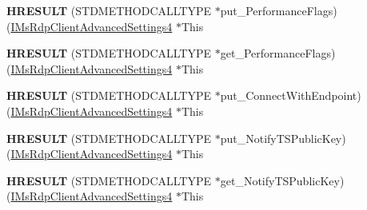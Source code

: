 \begin{DoxyCompactItemize}
{\bfseries H\+R\+E\+S\+U\+LT} (S\+T\+D\+M\+E\+T\+H\+O\+D\+C\+A\+L\+L\+T\+Y\+PE $\ast$put\+\_\+\+Performance\+Flags)(\hyperlink{interface_m_s_t_s_c_lib_1_1_i_ms_rdp_client_advanced_settings4}{I\+Ms\+Rdp\+Client\+Advanced\+Settings4} $\ast$This
\item 
\mbox{\label{struct_m_s_t_s_c_lib_1_1_i_ms_rdp_client_advanced_settings4_vtbl_a34690ef59bca6b2a9ad10f9aa11ef66f}} 
{\bfseries H\+R\+E\+S\+U\+LT} (S\+T\+D\+M\+E\+T\+H\+O\+D\+C\+A\+L\+L\+T\+Y\+PE $\ast$get\+\_\+\+Performance\+Flags)(\hyperlink{interface_m_s_t_s_c_lib_1_1_i_ms_rdp_client_advanced_settings4}{I\+Ms\+Rdp\+Client\+Advanced\+Settings4} $\ast$This
\item 
\mbox{\label{struct_m_s_t_s_c_lib_1_1_i_ms_rdp_client_advanced_settings4_vtbl_a0abbc8ceb1f5aeb103806004fdbf1287}} 
{\bfseries H\+R\+E\+S\+U\+LT} (S\+T\+D\+M\+E\+T\+H\+O\+D\+C\+A\+L\+L\+T\+Y\+PE $\ast$put\+\_\+\+Connect\+With\+Endpoint)(\hyperlink{interface_m_s_t_s_c_lib_1_1_i_ms_rdp_client_advanced_settings4}{I\+Ms\+Rdp\+Client\+Advanced\+Settings4} $\ast$This
\item 
\mbox{\label{struct_m_s_t_s_c_lib_1_1_i_ms_rdp_client_advanced_settings4_vtbl_a35adc970ff5396cd06ee8a3f3da79f06}} 
{\bfseries H\+R\+E\+S\+U\+LT} (S\+T\+D\+M\+E\+T\+H\+O\+D\+C\+A\+L\+L\+T\+Y\+PE $\ast$put\+\_\+\+Notify\+T\+S\+Public\+Key)(\hyperlink{interface_m_s_t_s_c_lib_1_1_i_ms_rdp_client_advanced_settings4}{I\+Ms\+Rdp\+Client\+Advanced\+Settings4} $\ast$This
\item 
\mbox{\label{struct_m_s_t_s_c_lib_1_1_i_ms_rdp_client_advanced_settings4_vtbl_a2eb5e9bdac925fe4b12860b5adf328a7}} 
{\bfseries H\+R\+E\+S\+U\+LT} (S\+T\+D\+M\+E\+T\+H\+O\+D\+C\+A\+L\+L\+T\+Y\+PE $\ast$get\+\_\+\+Notify\+T\+S\+Public\+Key)(\hyperlink{interface_m_s_t_s_c_lib_1_1_i_ms_rdp_client_advanced_settings4}{I\+Ms\+Rdp\+Client\+Advanced\+Settings4} $\ast$This
\item 
\mbox{\label{struct_m_s_t_s_c_lib_1_1_i_ms_rdp_client_advanced_settings4_vtbl_ad8e9f3d3792308b9c702fcd6a8ab4807}} 

\end{DoxyCompactItemize}
